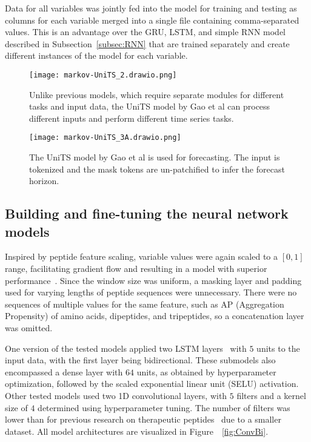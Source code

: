 \documentclass[preprint,12pt]{elsarticle}
\begin{document}
Data for all variables was jointly fed into the model for training and testing as columns for each variable merged into a single file containing comma-separated values. This is an advantage over the GRU, LSTM, and simple RNN model described in Subsection~\ref{subsec:RNN} that are trained separately and create different instances of the model for each variable. 

\begin{figure}[!ht]
    \centering
    \texttt{[image: markov-UniTS\_2.drawio.png]}
    \caption{Unlike previous models, which require separate modules for different tasks and input data, the UniTS model by Gao et al \citep{gao2024units} can process different inputs and perform different time series tasks.}
    \label{fig:UniTSvsOther}
\end{figure}

\begin{figure}[!ht]
    \centering
    \texttt{[image: markov-UniTS\_3A.drawio.png]}
    \caption{The UniTS model by Gao et al \citep{gao2024units} is used for forecasting. The input is tokenized and the mask tokens are un-patchified to infer the forecast horizon.}
    \label{fig:UniTSforecasting}
\end{figure}

\subsection{Building and fine-tuning the neural network models} 
\hspace{\parindent}

Inspired by peptide feature scaling, variable values were again scaled to a $[0, 1]$ range, facilitating gradient flow and resulting in a model with superior performance~\cite{singh2020investigating, nawi2013effect}. Since the window size was uniform, a masking layer and padding used for varying lengths of peptide sequences were unnecessary. There were no sequences of multiple values for the same feature, such as AP (Aggregation Propensity) of amino acids, dipeptides, and tripeptides, so a concatenation layer was omitted.

One version of the tested models applied two LSTM layers~\cite{pascanu2013difficulty} with $5$ units to the input data, with the first layer being bidirectional. These submodels also encompassed a dense layer with $64$ units, as obtained by hyperparameter optimization, followed by the scaled exponential linear unit (SELU) activation. Other tested models used two 1D convolutional layers, with $5$ filters and a kernel size of $4$ determined using hyperparameter tuning. The number of filters was lower than for previous research on therapeutic peptides~\cite{otovic2022sequential} due to a smaller dataset. All model architectures are visualized in Figure~~\ref{fig:ConvBi}.
\end{document}
